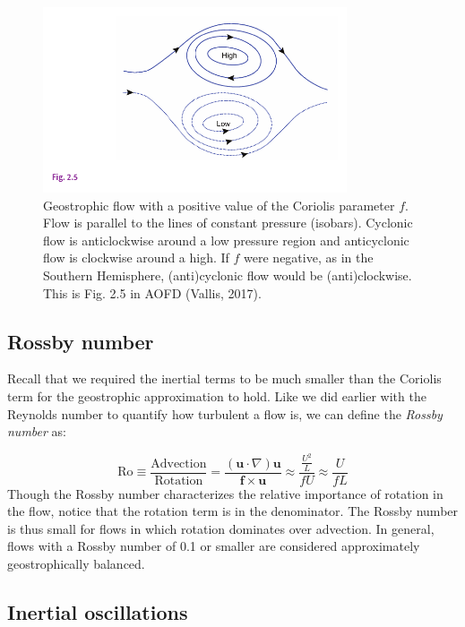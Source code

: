 \documentclass[12pt]{article}
\numberwithin{equation}{section}
\numberwithin{figure}{section}
\numberwithin{table}{section}
\begin{document}
\begin{figure}[h]
  \centering
  \includegraphics[width=0.8\textwidth]{assets/fig_geostrophic_balance.pdf}
  \caption{
    Geostrophic flow with a positive value of the Coriolis parameter $f$.
    Flow is parallel to the lines of constant pressure (isobars).
    Cyclonic flow is anticlockwise around a low pressure region and
    anticyclonic flow is clockwise around a high. If $f$ were negative, as in
    the Southern Hemisphere, (anti)cyclonic flow would be (anti)clockwise.
    This is Fig. 2.5 in AOFD (Vallis, 2017).
  }
  \label{fig:geostrophic_flow}
\end{figure}

\subsection{Rossby number}

Recall that we required the inertial terms to be much smaller than the Coriolis
term for the geostrophic approximation to hold.
Like we did earlier with the Reynolds number to quantify how turbulent a flow is,
we can define the \textit{Rossby number} as:

\begin{equation}
  \text{Ro} \equiv
  \frac{\text{Advection}}{\text{Rotation}} = 
  \frac{\left( \mathbf{u} \cdot \nabla \right) \mathbf{u}}{\mathbf{f} \times \mathbf{u}}
  \approx \frac{\frac{U^2}{L}}{fU}
  \approx \frac{U}{fL}
\end{equation}
Though the Rossby number characterizes the relative importance of rotation in
the flow, notice that the rotation term is in the denominator.
The Rossby number is thus small for flows in which rotation dominates over
advection.
In general, flows with a Rossby number of 0.1 or smaller are considered
approximately geostrophically balanced.

\subsection{Inertial oscillations}
\label{sec:inertial_oscillations}
\end{document}
